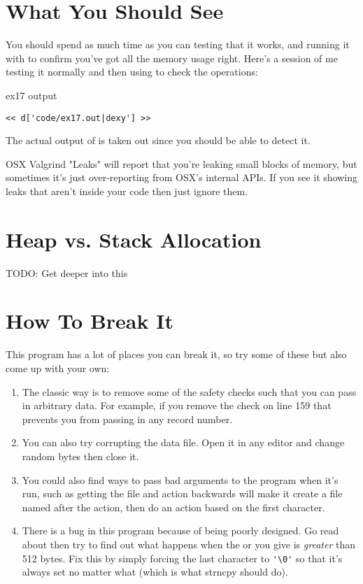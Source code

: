\section{What You Should See}

You should spend as much time as you can testing that it works, and running
it with  to confirm you've got all the memory usage
right.  Here's a session of me testing it normally and then using
 to check the operations:

\begin{code}{ex17 output}
\begin{lstlisting}
<< d['code/ex17.out|dexy'] >>
\end{lstlisting}
\end{code}

The actual output of  is taken out since you should
be able to detect it.

\begin{aside}{OSX Valgrind "Leaks"}
 will report that you're leaking small blocks of memory,
but sometimes it's just over-reporting from OSX's internal APIs.  If you see it
showing leaks that aren't inside your code then just ignore them.
\end{aside}

\section{Heap vs. Stack Allocation}

TODO: Get deeper into this

\section{How To Break It}

This program has a lot of places you can break it, so try some of these
but also come up with your own:

\begin{enumerate}
\item The classic way is to remove some of the safety checks such that you can
    pass in arbitrary data. For example, if you remove the check on line 159
    that prevents you from passing in any record number.
\item You can also try corrupting the data file.  Open it in any editor and
    change random bytes then close it.
\item You could also find ways to pass bad arguments to the program when it's
    run, such as getting the file and action backwards will make it create
    a file named after the action, then do an action based on the first
    character.
\item There is a bug in this program because of  being poorly
    designed.  Go read about  then try to find out what happens
    when the  or  you give is \emph{greater} than
    512 bytes.  Fix this by simply forcing the last character to \verb|'\0'|
    so that it's always set no matter what (which is what strncpy should do).
\end{enumerate}


